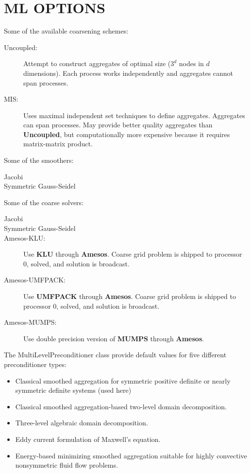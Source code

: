 \chapter{\uppercase{ML options}}

Some of the available coarsening schemes:
\begin{description}
  \item[Uncoupled:] Attempt to construct aggregates of optimal size ($3^d$
    nodes in $d$ dimensions). Each process works independently and aggregates
    cannot span processes.
  \item[MIS:] Uses maximal independent set techniques to define aggregates.
    Aggregates can span processes. May provide better quality aggregates than
    {\bf Uncoupled}, but computationally more expensive because it requires
    matrix-matrix product.
\end{description}
Some of the smoothers:
\begin{description}
  \item[Jacobi]
  \item[Symmetric Gauss-Seidel]
\end{description}
Some of the coarse solvers:
\begin{description}
  \item[Jacobi]
  \item[Symmetric Gauss-Seidel]
  \item[Amesos-KLU:] Use {\bf KLU} through {\bf Amesos}. Coarse grid problem
    is shipped to processor 0, solved, and solution is broadcast.
  \item[Amesos-UMFPACK:] Use {\bf UMFPACK} through {\bf Amesos}. Coarse grid
    problem is shipped to processor 0, solved, and solution is broadcast.
  \item[Amesos-MUMPS:] Use double precision version of {\bf MUMPS} through
    {\bf Amesos}.
\end{description}
The MultiLevelPreconditioner class provide default values for five different
preconditioner types:
\begin{itemize}
  \item Classical smoothed aggregation for symmetric positive definite or
    nearly symmetric definite systems (used here)
  \item Classical smoothed aggregation-based two-level domain decomposition.
  \item Three-level algebraic domain decomposition.
  \item Eddy current formulation of Maxwell's equation.
  \item Energy-based minimizing smoothed aggregation suitable for highly
    convective nonsymmetric fluid flow problems.
\end{itemize}
